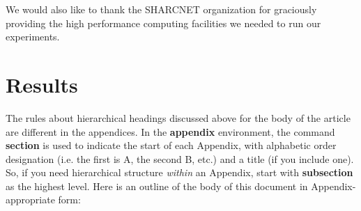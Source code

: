 \documentclass{sig-alternate}
\begin{document}
We would also like to thank the SHARCNET organization for graciously providing the high performance computing facilities we needed to run our experiments.



%
%

\appendix
\section{Results}
The rules about hierarchical headings discussed above for
the body of the article are different in the appendices.
In the \textbf{appendix} environment, the command
\textbf{section} is used to
indicate the start of each Appendix, with alphabetic order
designation (i.e. the first is A, the second B, etc.) and
a title (if you include one).  So, if you need
hierarchical structure
\textit{within} an Appendix, start with \textbf{subsection} as the
highest level. Here is an outline of the body of this
document in Appendix-appropriate form:
\end{document}

